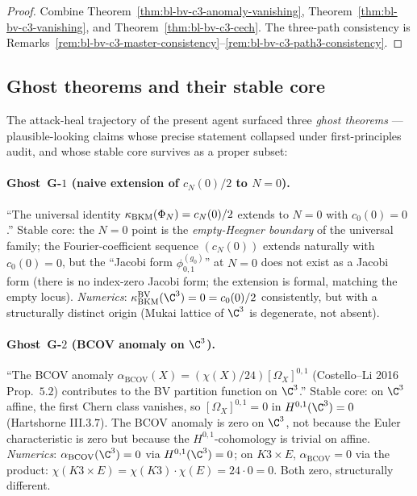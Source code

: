 \begin{proof}
Combine Theorem~\ref{thm:bl-bv-c3-anomaly-vanishing},
Theorem~\ref{thm:bl-bv-c3-vanishing}, and
Theorem~\ref{thm:bl-bv-c3-cech}. The three-path consistency is
Remarks~\ref{rem:bl-bv-c3-master-consistency}--\ref{rem:bl-bv-c3-path3-consistency}.
\end{proof}

\subsection*{Ghost theorems and their stable core}

The attack-heal trajectory of the present agent surfaced three
\emph{ghost theorems} — plausible-looking claims whose precise
statement collapsed under first-principles audit, and whose stable
core survives as a proper subset:

\paragraph{Ghost~G-$1$ (naive extension of $c_N(0)/2$ to $N = 0$).}
``The universal identity $\kappa_{\mathrm{BKM}}(\Phi_N) = c_N(0)/2$ extends to
$N = 0$ with $c_0(0) = 0$.'' Stable core: the $N = 0$ point is
the \emph{empty-Heegner boundary} of the universal family; the
Fourier-coefficient sequence $(c_N(0))$ extends naturally with
$c_0(0) = 0$, but the ``Jacobi form $\phi^{(g_0)}_{0, 1}$'' at
$N = 0$ does not exist as a Jacobi form (there is no index-zero
Jacobi form; the extension is formal, matching the empty locus).
\emph{Numerics}: $\kBKM^{\mathrm{BV}}(\C^3) = 0 = c_0(0)/2$
consistently, but with a structurally distinct origin (Mukai
lattice of $\C^3$ is degenerate, not absent).

\paragraph{Ghost~G-$2$ (BCOV anomaly on $\C^3$).}
``The BCOV anomaly $\alpha_{\mathrm{BCOV}}(X) = (\chi(X)/24)[\Omega_X]^{0,1}$
(Costello--Li 2016 Prop.~$5.2$) contributes to the BV partition
function on $\C^3$.'' Stable core: on $\C^3$ affine, the
first Chern class vanishes, so $[\Omega_X]^{0,1} = 0$ in
$H^{0,1}(\C^3) = 0$ (Hartshorne III.$3$.$7$). The BCOV anomaly is
zero on $\C^3$, not because the Euler characteristic is zero but
because the $H^{0,1}$-cohomology is trivial on affine.
\emph{Numerics}: $\alpha_{\mathrm{BCOV}}(\C^3) = 0$ via
$H^{0,1}(\C^3) = 0$; on $K3\times E$, $\alpha_{\mathrm{BCOV}} = 0$
via the product: $\chi(K3\times E) = \chi(K3)\cdot\chi(E) = 24\cdot 0
= 0$. Both zero, structurally different.

